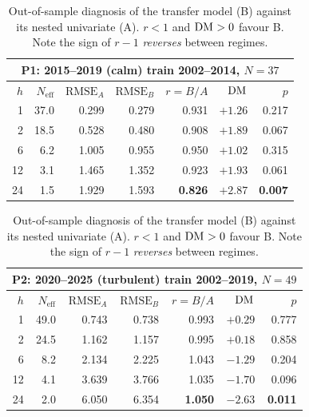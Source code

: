 \documentclass[11pt]{article}
\begin{document}
\begin{table}[h]
\centering\small
\begin{tabular}{rrrrrrr}
\toprule
\multicolumn{7}{c}{\textbf{P1: 2015--2019 (calm)} \quad train 2002--2014, $N=37$}\\
\midrule
$h$ & $N_{\mathrm{eff}}$ & $\mathrm{RMSE}_A$ & $\mathrm{RMSE}_B$ & $r=B/A$ & $\mathrm{DM}^{\*}$ & $p$\\
\midrule
 1 & 37.0 & 0.299 & 0.279 & 0.931 & $+1.26$ & 0.217\\
 2 & 18.5 & 0.528 & 0.480 & 0.908 & $+1.89$ & 0.067\\
 6 &  6.2 & 1.005 & 0.955 & 0.950 & $+1.02$ & 0.315\\
12 &  3.1 & 1.465 & 1.352 & 0.923 & $+1.93$ & 0.061\\
24 &  1.5 & 1.929 & 1.593 & \textbf{0.826} & $+2.87$ & \textbf{0.007}\\
\bottomrule
\end{tabular}
\hfill
\begin{tabular}{rrrrrrr}
\toprule
\multicolumn{7}{c}{\textbf{P2: 2020--2025 (turbulent)} \quad train 2002--2019, $N=49$}\\
\midrule
$h$ & $N_{\mathrm{eff}}$ & $\mathrm{RMSE}_A$ & $\mathrm{RMSE}_B$ & $r=B/A$ & $\mathrm{DM}^{\*}$ & $p$\\
\midrule
 1 & 49.0 & 0.743 & 0.738 & 0.993 & $+0.29$ & 0.777\\
 2 & 24.5 & 1.162 & 1.157 & 0.995 & $+0.18$ & 0.858\\
 6 &  8.2 & 2.134 & 2.225 & 1.043 & $-1.29$ & 0.204\\
12 &  4.1 & 3.639 & 3.766 & 1.035 & $-1.70$ & 0.096\\
24 &  2.0 & 6.050 & 6.354 & \textbf{1.050} & $-2.63$ & \textbf{0.011}\\
\bottomrule
\end{tabular}
\caption{Out-of-sample diagnosis of the transfer model (B) against its nested
univariate (A). $r<1$ and $\mathrm{DM}^{\*}>0$ favour B. Note the sign of $r-1$
\emph{reverses} between regimes.}
\end{table}
\end{document}
